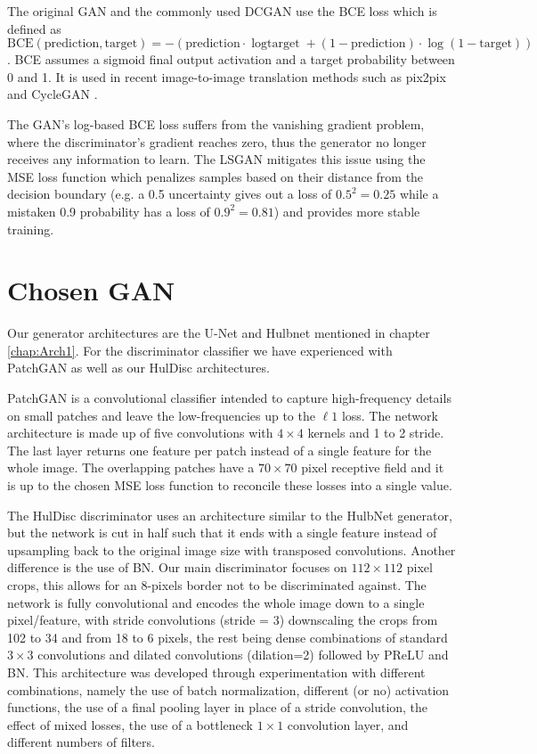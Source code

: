 The original \ac{GAN} and the commonly used \ac{DCGAN} use the \ac{BCE} loss which is defined as $\text{BCE}(\text{prediction}, \text{target})=-(\text{prediction}\cdot{\log{\text{target}}}+(1-\text{prediction})\cdot \log{(1-\text{target})})$. \ac{BCE} assumes a sigmoid final output activation and a target probability between 0 and 1. It is used in recent image-to-image translation methods such as pix2pix \cite{pix2pix} and CycleGAN \cite{cyclegan}.

The \ac{GAN}'s log-based \ac{BCE} loss suffers from the vanishing gradient problem, where the discriminator's gradient reaches zero, thus the generator no longer receives any information to learn. The \acf{LSGAN} mitigates this issue using the \acl{MSE} loss function which penalizes samples based on their distance from the decision boundary (e.g. a 0.5 uncertainty gives out a loss of $0.5^2=0.25$ while a mistaken 0.9 probability has a loss of $0.9^2=0.81$) and provides more stable training.

\section{Chosen GAN}\label{sec:HulDisc}

Our generator architectures are the U-Net \cite{unet} and Hulbnet mentioned in chapter \ref{chap:Arch1}. For the discriminator classifier we have experienced with PatchGAN \cite{pix2pix} as well as our HulDisc architectures.

PatchGAN is a convolutional classifier intended to capture high-frequency details on small patches and leave the low-frequencies up to the $\ell 1$ loss. The network architecture is made up of five convolutions with $4 \times 4$ kernels and 1 to 2 stride. The last layer returns one feature per patch instead of a single feature for the whole image. The overlapping patches have a $70 \times 70$ pixel receptive field and it is up to the chosen \ac{MSE} loss function to reconcile these losses into a single value.

The HulDisc discriminator uses an architecture similar to the HulbNet generator, but the network is cut in half such that it ends with a single feature instead of upsampling back to the original image size with transposed convolutions. Another difference is the use of \acl{BN}. Our main discriminator focuses on $112\times 112$ pixel crops, this allows for an 8-pixels border not to be discriminated against. The network is fully convolutional and encodes the whole image down to a single pixel/feature, with stride convolutions (stride = 3) downscaling the crops from 102 to 34 and from 18 to 6 pixels, the rest being dense combinations of standard $3\times 3$ convolutions and dilated convolutions (dilation=2) followed by \ac{PReLU} and \acl{BN}. This architecture was developed through experimentation with different combinations, namely the use of batch normalization, different (or no) activation functions, the use of a final pooling layer in place of a stride convolution, the effect of mixed losses, the use of a bottleneck $1\times 1$ convolution layer, and different numbers of filters.

